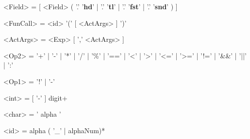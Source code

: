 \documentclass{article}
\begin{document}
\begin{grammar}
<Field> = [ <Field> ( '.' '\textbf{hd}' | '.' '\textbf{tl}' | '.' '\textbf{fst}' | '.' '\textbf{snd}' ) ]

<FunCall> = <id> '(' [ <ActArgs> ] ')'

<ActArgs> = <Exp> [ ',' <ActArgs> ]

<Op2> = '+' | '-' | '*' | '/' | '\%' | '==' | '\textless' | '\textgreater' | '\textless=' | '\textgreater=' | '!=' | '\&\&' | '||' | ':'

<Op1> = '!' | '-'

<int> = [ '-' ] digit+

<char> = ' alpha '

<id> = alpha ( '\_' | alphaNum)*
\end{grammar}

\end{document}

